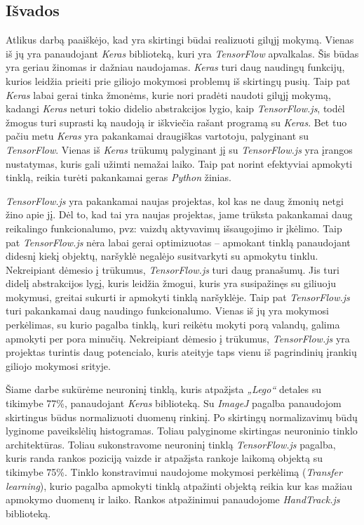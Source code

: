 \documentclass{VUMIFInfKursinis}
\begin{document}
\newpage
\subsection*{Išvados}

Atlikus darbą paaiškėjo, kad yra skirtingi būdai realizuoti gilųjį mokymą. Vienas iš jų yra panaudojant \textit{Keras} biblioteką, kuri yra  \textit{TensorFlow} apvalkalas. Šis būdas yra geriau žinomas ir dažniau naudojamas. \textit{Keras} turi daug naudingų funkcijų, kurios leidžia prieiti prie giliojo mokymosi problemų iš skirtingų pusių. Taip pat \textit{Keras} labai gerai tinka žmonėms, kurie nori pradėti naudoti gilųjį mokymą, kadangi \textit{Keras} neturi tokio didelio abstrakcijos lygio, kaip \textit{TensorFlow.js}, todėl žmogus turi suprasti ką naudoją ir iškviečia rašant programą su \textit{Keras}. Bet tuo pačiu metu \textit{Keras} yra pakankamai draugiškas vartotoju, palyginant su \textit{TensorFlow}. Vienas iš \textit{Keras} trūkumų palyginant jį su \textit{TensorFlow.js} yra įrangos nustatymas, kuris gali užimti nemažai laiko. Taip pat norint efektyviai apmokyti tinklą, reikia turėti pakankamai geras \textit{Python} žinias.
\par
\textit{TensorFlow.js} yra pakankamai naujas projektas, kol kas ne daug žmonių netgi žino apie jį. Dėl to, kad tai yra naujas projektas, jame trūksta pakankamai daug reikalingo funkcionalumo, pvz: vaizdų aktyvavimų išsaugojimo ir įkėlimo. Taip pat \textit{TensorFlow.js} nėra labai gerai optimizuotas -- apmokant tinklą panaudojant didesnį kiekį objektų, naršyklė negalėjo susitvarkyti su apmokytu tinklu. Nekreipiant dėmesio į trūkumus, \textit{TensorFlow.js} turi daug pranašumų. Jis turi didelį abstrakcijos lygį, kuris leidžia žmogui, kuris yra susipažinęs su giliuoju mokymusi, greitai sukurti ir apmokyti tinklą naršyklėje. Taip pat \textit{TensorFlow.js} turi pakankamai daug naudingo funkcionalumo. Vienas iš jų yra mokymosi perkėlimas, su kurio pagalba tinklą, kuri reikėtu mokyti porą valandų, galima apmokyti per pora minučių. Nekreipiant dėmesio į trūkumus, \textit{TensorFlow.js} yra projektas turintis daug potencialo, kuris ateityje taps vienu iš pagrindinių įrankių giliojo mokymosi srityje.
\par
Šiame darbe sukūrėme neuroninį tinklą, kuris atpažįsta \textit{„Lego“} detales su tikimybe 77\%, panaudojant \textit{Keras} biblioteką. Su \textit{ImageJ} pagalba panaudojom skirtingus būdus normalizuoti duomenų rinkinį. Po skirtingų normalizavimų būdų lyginome paveikslėlių histogramas. Toliau palyginome skirtingas neuroninio tinklo architektūras. Toliau sukonstravome neuroninį tinklą  \textit{TensorFlow.js} pagalba, kuris randa rankos poziciją vaizde ir atpažįsta rankoje laikomą objektą su tikimybe 75\%. Tinklo konstravimui naudojome mokymosi perkėlimą (\textit{Transfer learning}),  kurio pagalba apmokyti tinklą atpažinti objektą reikia kur kas mažiau apmokymo duomenų ir laiko. Rankos atpažinimui panaudojome \textit{HandTrack.js} biblioteką.
\end{document}
